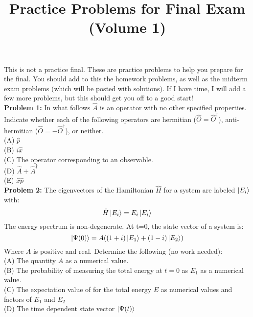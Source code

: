 \documentclass[12pt]{article}
\begin{document}
\newcommand{\ihbar}{\ensuremath{i \hbar}}
\newcommand{\dPsidt}{\ensuremath{ \frac{\partial \Psi}{\partial t} }}
\newcommand{\dPsidx}{\ensuremath{ \frac{\partial \Psi}{\partial x} }}
\newcommand{\ddPsidx}{\ensuremath{ \frac{\partial^2 \Psi}{\partial x^2} }}
\newcommand{\dPssdt}{\ensuremath{ \frac{\partial \Psi^*}{\partial t} }}
\newcommand{\dPssdx}{\ensuremath{ \frac{\partial \Psi^*}{\partial x} }}
\newcommand{\ddPssdx}{\ensuremath{ \frac{\partial^2 \Psi^*}{\partial x^2} }}

\newcommand{\dphidt}{\ensuremath{ \frac{d \phi}{dt} }}
\newcommand{\dpsidx}{\ensuremath{ \frac{d \psi}{dx} }}
\newcommand{\ddpsidx}{\ensuremath{ \frac{d^2 \psi}{dx^2} }}


\date{\vspace{-5ex}}

\title{Practice Problems for Final Exam (Volume 1)}

\maketitle

This is not a practice final.  These are practice problems to help you prepare for the final.  You should add to this the homework problems, as well as the midterm exam problems (which will be posted with solutions).  If I have time, I will add a few more problems, but this should get you off to a good start!\\[5pt]

\noindent
{\bf Problem 1:}
In what follows $\hat{A}$ is an operator with no other specified properties.  Indicate whether each of the following operators are hermitian ($\hat{O}=\hat{O}^\dagger$), anti-hermitian ($\hat{O}=-\hat{O}^\dagger$), or neither.\\[5pt]
(A) $\hat{p}$ \\[5pt]
(B) $i \hat{x}$ \\[5pt]
(C) The operator corresponding to an observable. \\[5pt]
(D) $\hat{A} + \hat{A}^\dagger$ \\[5pt] 
(E) $\hat{x} \hat{p}$\\[5pt]

\noindent
{\bf Problem 2:}
The eigenvectors of the Hamiltonian $\hat{H}$ for a system are labeled $\ket{E_i}$ with:
$$\hat{H} \ket{E_i} = E_i \ket{E_i}$$
The energy spectrum is non-degenerate.  At t=0, the state vector of a system is:
$$\ket{\Psi(0)} = A((1+i)\ket{E_1} + (1-i)\ket{E_2})$$
Where $A$ is positive and real.  Determine the following (no work needed):\\[5pt]
(A) The quantity $A$ as a numerical value.\\[5pt]
(B) The probability of measuring the total energy at $t=0$ as $E_1$ as a numerical value.\\[5pt]
(C) The expectation value of for the total energy $E$ as numerical values and factors of $E_1$ and $E_2$\\[5pt]
(D) The time dependent state vector $\ket{\Psi(t)}$\\[5pt]
\end{document}
